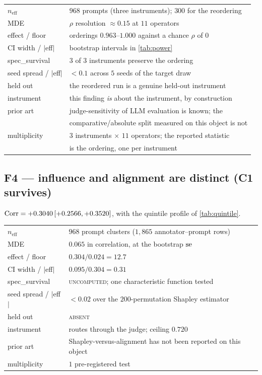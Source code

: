 \begin{table}[H]\centering\footnotesize
\begin{tabular}{ll}
\toprule
$n_{\text{eff}}$ & $968$ prompts (three instruments); $300$ for the reordering\\
MDE & $\rho$ resolution $\approx 0.15$ at $11$ operators\\
effect / floor & orderings $0.963$--$1.000$ against a chance $\rho$ of $0$\\
CI width / $|$eff$|$ & bootstrap intervals in \cref{tab:power}\\
spec\_survival & $3$ of $3$ instruments preserve the ordering\\
seed spread / $|$eff$|$ & $<0.1$ across $5$ seeds of the target draw\\
held out & the reordered run is a genuine held-out instrument\\
instrument & this finding \emph{is} about the instrument, by construction\\
prior art & judge-sensitivity of LLM evaluation is known; the\\
 & comparative/absolute split measured on this object is not\\
multiplicity & $3$ instruments $\times$ $11$ operators; the reported statistic\\
 & is the ordering, one per instrument\\
\bottomrule
\end{tabular}
\end{table}

\subsection{F4 --- influence and alignment are distinct (C1 survives)}

$\operatorname{Corr} = +0.3040\,[+0.2566,+0.3520]$, with the quintile profile of
\cref{tab:quintile}.

\begin{table}[H]\centering\footnotesize
\begin{tabular}{ll}
\toprule
$n_{\text{eff}}$ & $968$ prompt clusters ($1{,}865$ annotator--prompt rows)\\
MDE & $0.065$ in correlation, at the bootstrap $\operatorname{se}$\\
effect / floor & $0.304 / 0.024 = 12.7$\\
CI width / $|$eff$|$ & $0.095/0.304 = 0.31$\\
spec\_survival & \textsc{uncomputed}; one characteristic function tested\\
seed spread / $|$eff$|$ & $<0.02$ over the $200$-permutation Shapley estimator\\
held out & \textsc{absent}\\
instrument & routes through the judge; ceiling $0.720$\\
prior art & Shapley-versus-alignment has not been reported on this object\\
multiplicity & $1$ pre-registered test\\
\bottomrule
\end{tabular}
\end{table}

